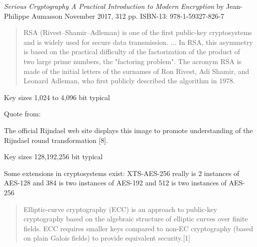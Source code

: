 \documentclass[Screen16to9,17pt]{foils}
\begin{document}



\emph{Serious Cryptography
A Practical Introduction to Modern Encryption}
by Jean-Philippe Aumasson
November 2017, 312 pp.
ISBN-13:
978-1-59327-826-7




\begin{quote}
RSA (Rivest–Shamir–Adleman) is one of the first public-key cryptosystems and is widely used for secure data transmission. ...
In RSA, this asymmetry is based on the practical difficulty of the factorization of the product of two large prime numbers, the "factoring problem". The acronym RSA is made of the initial letters of the surnames of Ron Rivest, Adi Shamir, and Leonard Adleman, who first publicly described the algorithm in 1978.
\end{quote}

\begin{list2}
\item Key sizes	1,024 to 4,096 bit typical
\item  Quote from: 
\end{list2}





\begin{list2}
\item The official Rijndael web site displays this image to promote understanding of the Rijndael round transformation [8].
\item Key sizes 128,192,256 bit typical
\item Some extensions in cryptosystems exist: XTS-AES-256 really is 2 instances of AES-128 and 384 is two instances of AES-192 and 512 is two instances of AES-256
\item {}
\end{list2}




\begin{quote}
Elliptic-curve cryptography (ECC) is an approach to public-key cryptography based on the algebraic structure of elliptic curves over finite fields. ECC requires smaller keys compared to non-EC cryptography (based on plain Galois fields) to provide equivalent security.[1]
\end{quote}
\end{document}
